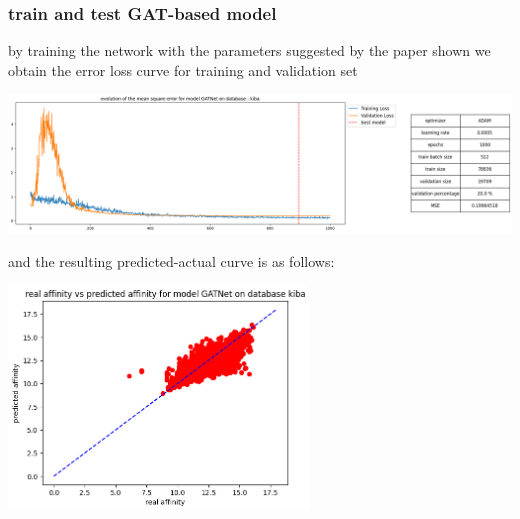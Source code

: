 \documentclass[11pt, a4paper]{article}
\begin{document}
        \subsubsection{train and test GAT-based model}
        by training the network with the parameters suggested by the paper shown we obtain the error loss curve for training and validation set 
        \begin{center}
            \includegraphics[width=1.0\textwidth]{train_test_plots/kiba GAT train.png}
        \end{center}
        and the resulting predicted-actual curve is as follows:
        \begin{center}
            \includegraphics[width=0.6\textwidth]{train_test_plots/kiba GAT test.png}
        \end{center}
\end{document}
